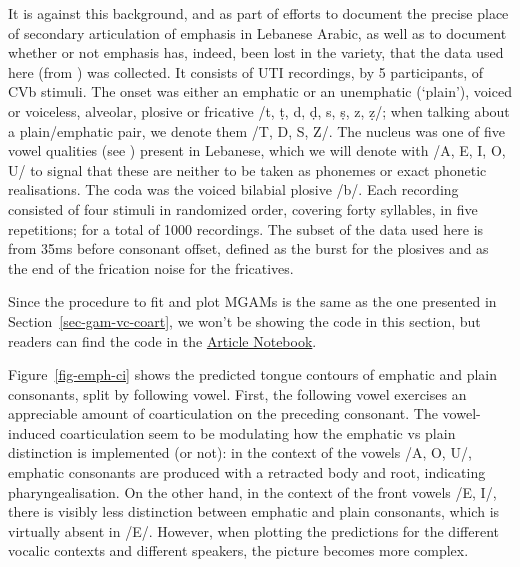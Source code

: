 \documentclass[
  man,
  longtable,
  nolmodern,
  notxfonts,
  notimes,
  colorlinks=true,linkcolor=blue,citecolor=blue,urlcolor=blue]{apa7}
\begin{document}
It is against this background, and as part of efforts to document the
precise place of secondary articulation of emphasis in Lebanese Arabic,
as well as to document whether or not emphasis has, indeed, been lost in
the variety, that the data used here (from ) was collected. It consists of UTI recordings, by 5 participants,
of CVb stimuli. The onset was either an emphatic or an unemphatic
(`plain'), voiced or voiceless, alveolar, plosive or fricative /t, ṭ, d,
ḍ, s, ṣ, z, ẓ/; when talking about a plain/emphatic pair, we denote them
/T, D, S, Z/. The nucleus was one of five vowel qualities (see
) present in Lebanese, which we will
denote with /A, E, I, O, U/ to signal that these are neither to be taken
as phonemes or exact phonetic realisations. The coda was the voiced
bilabial plosive /b/. Each recording consisted of four stimuli in
randomized order, covering forty syllables, in five repetitions; for a
total of 1000 recordings. The subset of the data used here is from 35ms
before consonant offset, defined as the burst for the plosives and as
the end of the frication noise for the fricatives.

Since the procedure to fit and plot MGAMs is the same as the one
presented in Section~\ref{sec-gam-vc-coart}, we won't be showing the
code in this section, but readers can find the code in the
\href{index.qmd}{Article Notebook}.

Figure~\ref{fig-emph-ci} shows the predicted tongue contours of emphatic
and plain consonants, split by following vowel. First, the following
vowel exercises an appreciable amount of coarticulation on the preceding
consonant. The vowel-induced coarticulation seem to be modulating how
the emphatic vs plain distinction is implemented (or not): in the
context of the vowels /A, O, U/, emphatic consonants are produced with a
retracted body and root, indicating pharyngealisation. On the other
hand, in the context of the front vowels /E, I/, there is visibly less
distinction between emphatic and plain consonants, which is virtually
absent in /E/. However, when plotting the predictions for the different
vocalic contexts and different speakers, the picture becomes more
complex.
\end{document}
